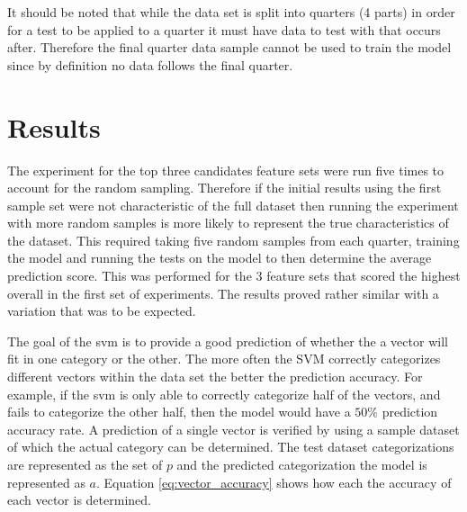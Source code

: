 
It should be noted that while the data set is split into quarters (4 parts) in order for a test to be applied to a quarter it must have data to test with that occurs after. Therefore the final quarter data sample cannot be used to train the model since by definition no data follows the final quarter.

\section{Results}


The experiment for the top three candidates feature sets were run five times to account for the random sampling. Therefore if the initial results using the first sample set were not characteristic of the full dataset then running the experiment with more random samples is more likely to represent the true characteristics of the dataset. This required taking five random samples from each quarter, training the model and running the tests on the model to then determine the average prediction score. This was performed for the 3 feature sets that scored the highest overall in the first set of experiments. The results proved rather similar with a variation that was to be expected.

The goal of the \gls{svm} is to provide a good prediction of whether the a vector will fit in one category or the other. The more often the SVM correctly categorizes different vectors within the data set the better the prediction accuracy. For example, if the \gls{svm} is only able to correctly categorize half of the vectors, and fails to categorize the other half, then the model would have a $50\%$ prediction accuracy rate. A prediction of a single vector is verified by using a sample dataset of which the actual category can be determined. The test dataset categorizations are represented as the set of $p$ and the predicted categorization the model is represented as $a$. Equation \ref{eq:vector_accuracy} shows how each the accuracy of each vector is determined.

